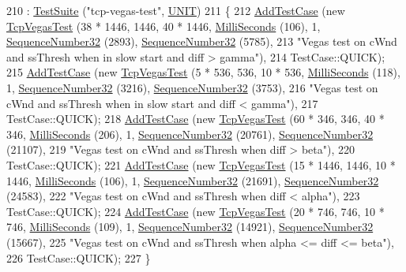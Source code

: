 \begin{DoxyCode}
210                        : \hyperlink{classns3_1_1TestSuite_a904b0c40583b744d30908aeb94636d1a}{TestSuite} (\textcolor{stringliteral}{"tcp-vegas-test"}, \hyperlink{classns3_1_1TestSuite_a1ebfcab34ec8161e085e8e3a1855eae0a3885375a3787abf60431f8454b3cadbd}{UNIT})
211   \{
212     \hyperlink{classns3_1_1TestCase_a3718088e3eefd5d6454569d2e0ddd835}{AddTestCase} (\textcolor{keyword}{new} \hyperlink{classTcpVegasTest}{TcpVegasTest} (38 * 1446, 1446, 40 * 1446, 
      \hyperlink{group__timecivil_gaf26127cf4571146b83a92ee18679c7a9}{MilliSeconds} (106), 1, \hyperlink{classns3_1_1SequenceNumber}{SequenceNumber32} (2893), 
      \hyperlink{classns3_1_1SequenceNumber}{SequenceNumber32} (5785),
213                                    \textcolor{stringliteral}{"Vegas test on cWnd and ssThresh when in slow start and diff > gamma"}),
214                  TestCase::QUICK);
215     \hyperlink{classns3_1_1TestCase_a3718088e3eefd5d6454569d2e0ddd835}{AddTestCase} (\textcolor{keyword}{new} \hyperlink{classTcpVegasTest}{TcpVegasTest} (5 * 536, 536, 10 * 536, 
      \hyperlink{group__timecivil_gaf26127cf4571146b83a92ee18679c7a9}{MilliSeconds} (118), 1, \hyperlink{classns3_1_1SequenceNumber}{SequenceNumber32} (3216), 
      \hyperlink{classns3_1_1SequenceNumber}{SequenceNumber32} (3753),
216                                    \textcolor{stringliteral}{"Vegas test on cWnd and ssThresh when in slow start and diff < gamma"}),
217                  TestCase::QUICK);
218     \hyperlink{classns3_1_1TestCase_a3718088e3eefd5d6454569d2e0ddd835}{AddTestCase} (\textcolor{keyword}{new} \hyperlink{classTcpVegasTest}{TcpVegasTest} (60 * 346, 346, 40 * 346, 
      \hyperlink{group__timecivil_gaf26127cf4571146b83a92ee18679c7a9}{MilliSeconds} (206), 1, \hyperlink{classns3_1_1SequenceNumber}{SequenceNumber32} (20761), 
      \hyperlink{classns3_1_1SequenceNumber}{SequenceNumber32} (21107),
219                                    \textcolor{stringliteral}{"Vegas test on cWnd and ssThresh when diff > beta"}),
220                  TestCase::QUICK);
221     \hyperlink{classns3_1_1TestCase_a3718088e3eefd5d6454569d2e0ddd835}{AddTestCase} (\textcolor{keyword}{new} \hyperlink{classTcpVegasTest}{TcpVegasTest} (15 * 1446, 1446, 10 * 1446, 
      \hyperlink{group__timecivil_gaf26127cf4571146b83a92ee18679c7a9}{MilliSeconds} (106), 1, \hyperlink{classns3_1_1SequenceNumber}{SequenceNumber32} (21691), 
      \hyperlink{classns3_1_1SequenceNumber}{SequenceNumber32} (24583),
222                                    \textcolor{stringliteral}{"Vegas test on cWnd and ssThresh when diff < alpha"}),
223                  TestCase::QUICK);
224     \hyperlink{classns3_1_1TestCase_a3718088e3eefd5d6454569d2e0ddd835}{AddTestCase} (\textcolor{keyword}{new} \hyperlink{classTcpVegasTest}{TcpVegasTest} (20 * 746, 746, 10 * 746, 
      \hyperlink{group__timecivil_gaf26127cf4571146b83a92ee18679c7a9}{MilliSeconds} (109), 1, \hyperlink{classns3_1_1SequenceNumber}{SequenceNumber32} (14921), 
      \hyperlink{classns3_1_1SequenceNumber}{SequenceNumber32} (15667),
225                                    \textcolor{stringliteral}{"Vegas test on cWnd and ssThresh when alpha <= diff <= beta"}),
226                  TestCase::QUICK);
227   \}
\end{DoxyCode}


